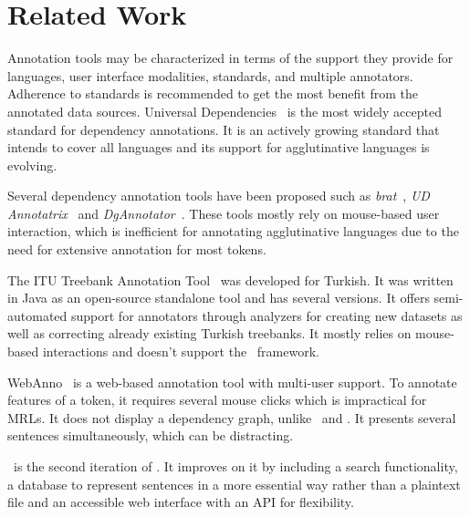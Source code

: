 \section{Related Work}
\label{sec:related}

Annotation tools may be characterized in terms of the support they provide for languages, user interface modalities, standards, and multiple annotators.
Adherence to standards is recommended to get the most benefit from the annotated data sources.
Universal Dependencies~\cite{UD} is the most widely accepted standard for dependency annotations.
It is an actively growing standard that intends to cover all languages and its support for agglutinative languages is evolving.

Several dependency annotation tools have been proposed such as \textit{brat}~\cite{brat}, \textit{UD Annotatrix}~\cite{tyers-etal:2018} and \textit{DgAnnotator}~\cite{dgannotator,UD-tools}.
These tools mostly rely on mouse-based user interaction, which is inefficient for annotating agglutinative languages due to the need for extensive annotation for most tokens.

The ITU Treebank Annotation Tool~\cite{pamay-etal-2015-annotation} was developed for Turkish.
It was written in Java as an open-source standalone tool and has several versions.
It offers semi-automated support for annotators through analyzers for creating new datasets as well as correcting already existing Turkish treebanks.
It mostly relies on mouse-based interactions and doesn't support the \ud\ framework.

WebAnno~\cite{webanno} is a web-based annotation tool with multi-user support.
To annotate features of a token, it requires several mouse clicks which is impractical for MRLs.
It does not display a dependency graph, unlike \boatvone\ and \boatvtwo.
It presents several sentences simultaneously, which can be distracting.

\boatvtwo\ is the second iteration of \boatvone.
It improves on it by including a search functionality, a database to represent sentences in a more essential way rather than a plaintext file and an accessible web interface with an API for flexibility.
